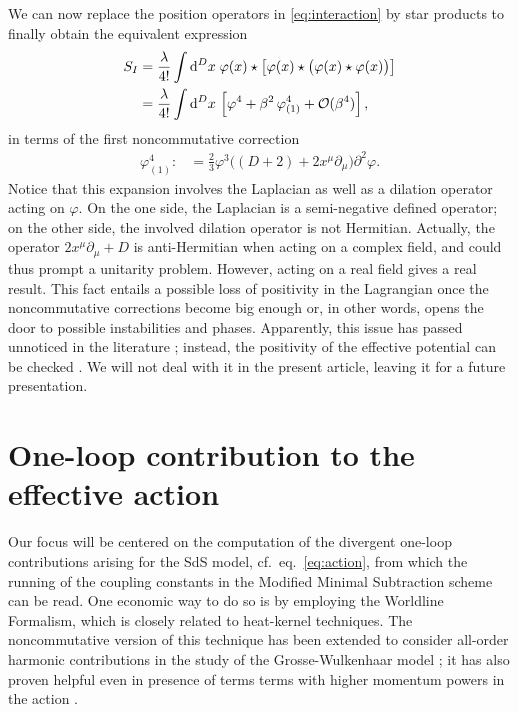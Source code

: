\documentclass[a4paper,10pt]{amsart}
\newcommand{\nocol}[1]{{#1}}
\begin{document}
We can now replace the position operators in \eqref{eq:interaction} by star products to finally obtain the equivalent expression
\begin{align}\label{eq:interaction2}
\begin{split}
 S_I
 &=\frac{\lambda}{4!}\int {\rm d}^Dx \; \varphi(x) \star \big[ \varphi(x) \star \big(\varphi(x) \star \varphi(x) \big)\big]
 \\
 &=\frac{\lambda}{4!} \int {\rm d}^Dx \,\left[\varphi^4 + \beta^2\, \varphi^4_{(1)}+\mathcal{O}(\beta^4)\right],
\end{split}
\end{align}
in terms of the first noncommutative correction
\begin{align}\label{eq.phi_fourth}
 \varphi^4_{(1)}:&= \frac{2}{3} \varphi^3    \Big( (D+2) +2 x^{\mu} \partial_{\mu} \Big) \partial^2\varphi.
\end{align}
Notice that this expansion involves the Laplacian as well as a dilation operator acting on $\varphi$.
\nocol{On the one side, the Laplacian is a semi-negative defined operator;
on the other side, the involved dilation operator is not Hermitian.
Actually, the operator $2x^\mu\partial_\mu+D$ is anti-Hermitian when acting on a complex field,
and could thus prompt a unitarity problem.
However, acting on a real field gives a real result.
This fact entails a possible loss of positivity in the Lagrangian once the noncommutative corrections become big enough
or, in other words, opens the door to possible instabilities and phases.
Apparently, this issue has passed unnoticed in the literature \cite{Franchino-Vinas:2018jcs, Franchino-Vinas:2019nqy, Meljanac:2017grw, Meljanac:2017jyk};
{instead, the positivity of the effective potential can be checked \cite{Meljanac:2017jyk}}.
We will not deal with it in the present article, leaving it for a future presentation.
}




\section{One-loop contribution to the effective action}\label{sec:EA}
Our focus will be centered on the computation of the divergent one-loop contributions arising for the SdS model, cf.~eq.~\eqref{eq:action},
from which the running of the coupling constants in the \nocol{Modified Minimal Subtraction} scheme can be read.
One economic way to do so is by employing the Worldline Formalism, which is closely related to heat-kernel techniques.
The noncommutative version of this technique \cite{Bonezzi:2012vr} has been extended to consider all-order harmonic contributions in the study of the Grosse-Wulkenhaar model \cite{Vinas:2014exa};
it has also proven helpful even in presence of terms terms with higher momentum powers in the action \cite{Franchino-Vinas:2018jcs}.
\end{document}
